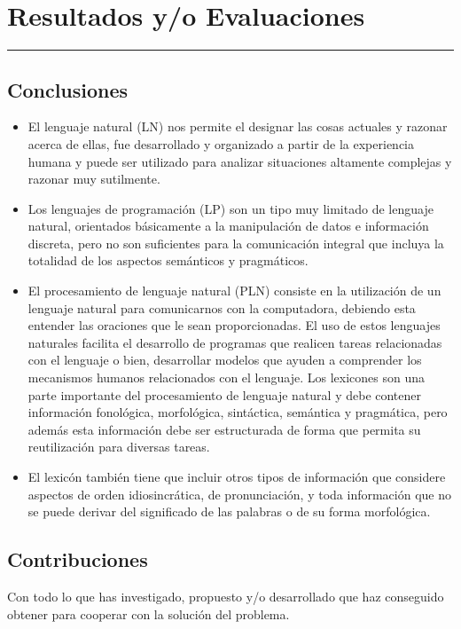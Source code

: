 \chapter{Resultados y/o Evaluaciones}
\hrule \bigskip \vspace*{1cm}

\section{Conclusiones}
\begin{itemize}
  \item El lenguaje natural (LN) nos permite el designar las cosas actuales y razonar acerca de ellas, fue desarrollado y organizado a partir de la experiencia humana y puede ser utilizado para analizar situaciones altamente complejas y razonar muy sutilmente. 
 \item  Los lenguajes de programación (LP) son un tipo muy limitado de lenguaje natural, orientados básicamente a la manipulación de datos e información discreta, pero no son suficientes para la comunicación integral que incluya la totalidad de los aspectos semánticos y pragmáticos.
 \item  El procesamiento de lenguaje natural (PLN) consiste en la utilización de un lenguaje natural para comunicarnos con la computadora, debiendo esta entender las oraciones que le sean proporcionadas. El uso de estos lenguajes naturales facilita el desarrollo de programas que realicen tareas relacionadas con el lenguaje o bien, desarrollar modelos que ayuden a comprender los mecanismos humanos relacionados con el lenguaje. Los lexicones son una parte importante del procesamiento de lenguaje natural y debe contener información fonológica, morfológica, sintáctica, semántica y pragmática, pero además esta información debe ser estructurada de forma que permita su reutilización para diversas tareas.
 \item  El lexicón también tiene que incluir otros tipos de información que considere aspectos de orden idiosincrática, de pronunciación, y toda información que no se puede derivar del significado de las palabras o de su forma morfológica.
\end{itemize}

\section{Contribuciones}

Con todo lo que has investigado, propuesto y/o desarrollado que haz
conseguido obtener para cooperar con la solución del problema.

